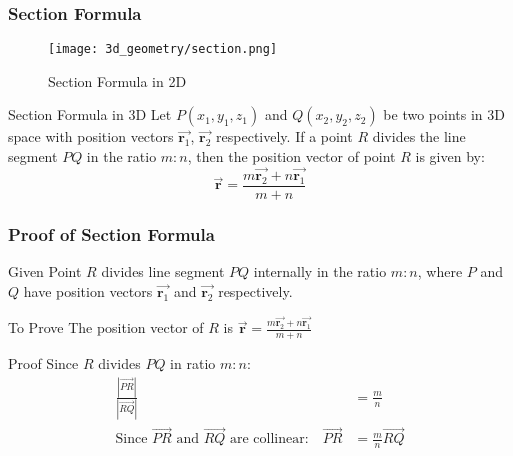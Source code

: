 \begin{frame}
    \frametitle{Section Formula}
    \begin{figure}
        \texttt{[image: 3d\_geometry/section.png]}
        \caption{Section Formula in 2D}
    \end{figure} 
\end{frame}


\begin{frame}
    \begin{block}{Section Formula in 3D}
    Let \(P(x_1, y_1, z_1)\) and \(Q(x_2, y_2, z_2)\) be two points in 3D space with position vectors \( \vec{\mathbf{r}_1} \), \( \vec{\mathbf{r}_2} \) respectively. If a point \(R\) divides the line segment \(PQ\) in the ratio \(m:n\), then the position vector of point \(R\) is given by:
    \[
    \vec{\mathbf{r}} = \frac{m\vec{\mathbf{r}_2} + n\vec{\mathbf{r}_1}}{m+n}
    \]
    \end{block}
\end{frame}

\begin{frame}
    \frametitle{Proof of Section Formula}
    \begin{block}{Given}
    Point \(R\) divides line segment \(PQ\) internally in the ratio \(m:n\), where \(P\) and \(Q\) have position vectors \(\vec{\mathbf{r}_1}\) and \(\vec{\mathbf{r}_2}\) respectively.
    \end{block}
    
    \begin{block}{To Prove}
    The position vector of \(R\) is \(\vec{\mathbf{r}} = \frac{m\vec{\mathbf{r}_2} + n\vec{\mathbf{r}_1}}{m+n}\)
    \end{block}
    
    \begin{block}{Proof}
    Since \(R\) divides \(PQ\) in ratio \(m:n\):
    \begin{align}
        \frac{|\vec{PR}|}{|\vec{RQ}|} &= \frac{m}{n} \\
        \text{Since } \vec{PR} \text{ and } \vec{RQ} \text{ are collinear:} \quad \vec{PR} &= \frac{m}{n}\vec{RQ}
    \end{align}
    \end{block}
\end{frame}

